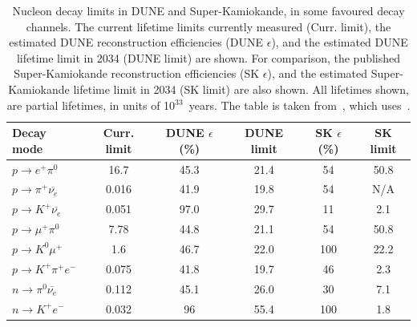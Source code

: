 \begin{table}
  \caption[Nucleon decay limits in DUNE and Super-Kamiokande, in some favoured decay channels]
          {Nucleon decay limits in DUNE and Super-Kamiokande, in some favoured decay channels. The current lifetime limits currently measured (Curr. limit), the estimated DUNE reconstruction efficiencies (DUNE $\epsilon$), and the estimated DUNE lifetime limit in 2034 (DUNE limit) are shown. For comparison, the published Super-Kamiokande reconstruction efficiencies (SK $\epsilon$), and the estimated Super-Kamiokande lifetime limit in 2034 (SK limit) are also shown. All lifetimes shown, are partial lifetimes, in units of 10$^{33}$~years. The table is taken from~\citep{MauryLifetime}, which uses~\citep{PDGReview}.}
  \centering
  \label{tab:NDKLim}
  \begin{tabular}{l c c c c c}
    \toprule
    {Decay mode}                               & {Curr. limit} & {DUNE $\epsilon$ (\%)} & {DUNE limit} & {SK $\epsilon$ (\%)} & {SK limit} \\ 
    \midrule
    $p \rightarrow e^{+} \pi^{0}$              & 16.7          & 45.3              & 21.4         & 54              & 50.8       \\
    
    $p \rightarrow \pi^{+} \overline{\nu_{e}}$ & 0.016         & 41.9              & 19.8         & 54              & N/A        \\
    
    $p \rightarrow K^{+} \overline{\nu_{e}}$   & 0.051         & 97.0              & 29.7         & 11              & 2.1        \\
    
    $p \rightarrow \mu^{+} \pi^{0}$            & 7.78          & 44.8              & 21.1         & 54              & 50.8       \\
    
    $p \rightarrow K^{0} \mu^{+}$              & 1.6           & 46.7              & 22.0         & 100             & 22.2       \\

    $p \rightarrow K^{+} \pi^{+} e^{-}$        & 0.075         & 41.8              & 19.7         & 46              & 2.3        \\
    
    $n \rightarrow \pi^{0} \overline{\nu_{e}}$ & 0.112         & 45.1              & 26.0         & 30              & 7.1        \\
    
    $n \rightarrow K^{+} e^{-}$                & 0.032         & 96                & 55.4         & 100             & 1.8        \\
    \bottomrule
  \end{tabular}
\end{table}

